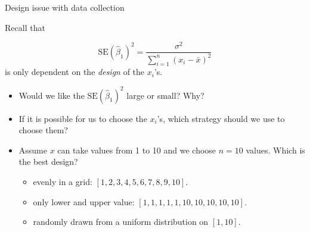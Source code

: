 \documentclass[10pt,ignorenonframetext,]{beamer}
\providecommand{\tightlist}{%
  \setlength{\itemsep}{0pt}\setlength{\parskip}{0pt}}
\begin{document}
\begin{frame}

\begin{block}{Design issue with data collection}

Recall that

\[\text{SE}(\hat{\beta}_1)^2 = \frac{\sigma^2}{\sum_{i=1}^n (x_i-\bar{x})^2}\]
is only dependent on the \emph{design} of the \(x_i\)'s.

\begin{itemize}
\tightlist
\item
  Would we like the \(\text{SE}(\hat{\beta}_1)^2\) large or small? Why?
\item
  If it is possible for us to choose the \(x_i\)'s, which strategy
  should we use to choose them?
\item
  Assume \(x\) can take values from 1 to 10 and we choose \(n=10\)
  values. Which is the best design?

  \begin{itemize}
  \tightlist
  \item
    evenly in a grid: \([1,2,3,4,5,6,7,8,9,10]\).
  \item
    only lower and upper value: \([1,1,1,1,1,10,10,10,10,10]\).
  \item
    randomly drawn from a uniform distribution on \([1,10]\).
  \end{itemize}
\end{itemize}

\end{block}

\end{frame}
\end{document}
